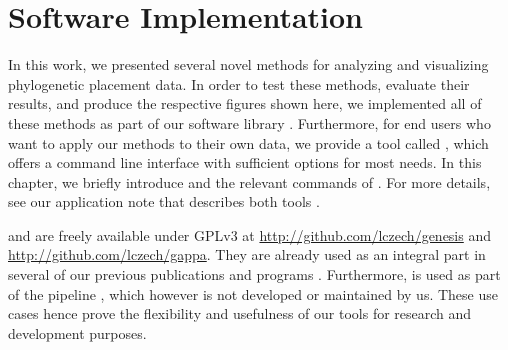 
\cleardoublepage

\chapter{Software Implementation}
\label{ch:PipelineImplementation}


In this work, we presented several novel methods for analyzing and visualizing phylogenetic placement data.
In order to test these methods, evaluate their results, and produce the respective figures shown here,
we implemented all of these methods as part of our software library .
Furthermore, for end users who want to apply our methods to their own data,
we provide a tool called , which offers a command line interface with sufficient options for most needs.
In this chapter, we briefly introduce  and the relevant commands of .
For more details, see our application note that describes both tools \cite{Czech2019-genesis-gappa}.

 and  are freely available under GPLv3
at \url{http://github.com/lczech/genesis} and \url{http://github.com/lczech/gappa}.
They are already used as an integral part
in several of our previous publications and programs \cite{Mahe2017,Barbera2018,Zhou2017,Czech2018-phat,Czech2019-analysis}.
Furthermore,  is used as part of the  pipeline \cite{Douglas2019},
which however is not developed or maintained by us.
These use cases hence prove the flexibility and usefulness of our tools for research and development purposes.


